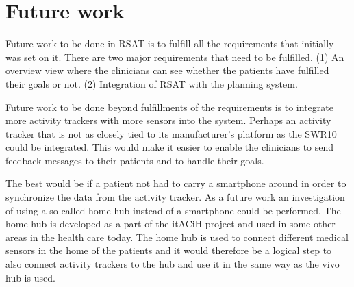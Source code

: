 \documentclass{cslthse-msc}
\begin{document}






\section{Future work}


Future work to be done in RSAT is to fulfill all the requirements that initially was set on it. There are two major requirements that need to be fulfilled. (1) An overview view where the clinicians can see whether the patients have fulfilled their goals or not. (2) Integration of RSAT with the planning system. 

Future work to be done beyond fulfillments  of the requirements is to integrate more activity trackers with more sensors into the system.  Perhaps an activity tracker that is not as closely tied to its manufacturer’s platform as the SWR10 could be integrated. This would make it easier to enable the clinicians to send feedback messages to their patients and to handle their goals. 

The best would be if a patient not had to carry a smartphone around in order to synchronize the data from the activity tracker. As a future work an investigation of using a so-called home hub instead of a smartphone could be performed. The home hub is developed as a part of the itACiH project and used in some other areas in the health care today. The home hub is  used to connect different medical sensors in the home of the patients and it would therefore be a logical step to also connect activity trackers to the hub 
and use it in the same way as the vivo hub is used. 
\end{document}
